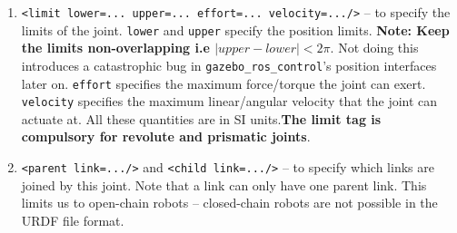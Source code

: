 \documentclass{article}
\begin{document}
\begin{enumerate}
\begin{enumerate}
                    \item \texttt{<limit lower=... upper=... effort=... velocity=.../>} -- to specify the 
                    limits of the joint. \texttt{lower} and \texttt{upper} specify the 
                    position limits. \textbf{Note: Keep the limits non-overlapping i.e  $|upper - lower| < 2\pi$}. Not doing 
                    this introduces a catastrophic bug in \texttt{gazebo\_ros\_control}'s position interfaces later on. \texttt{effort} 
                    specifies the maximum force/torque the joint can exert. \texttt{velocity} specifies the maximum
                    linear/angular velocity that the joint can actuate at. All these quantities are in SI units.\textbf{The limit tag is 
                    compulsory for revolute and prismatic joints}.
                    \item \texttt{<parent link=.../>} and \texttt{<child link=.../>} -- to specify
                    which links are joined by this joint. Note that a link can only have one 
                    parent link. This limits us to open-chain robots -- closed-chain robots are 
                    not possible in the URDF file format.
                \end{enumerate}

            \end{enumerate}
\end{document}
